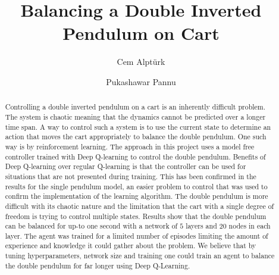 \documentclass{LTHtwocol} %
\begin{document}
\begin{frontmatter}
\title{Balancing a Double Inverted Pendulum on Cart} %

\author[cem]{Cem Alpt\"urk}
\author[pukashawar]{Pukashawar Pannu}


\begin{abstract}
    Controlling a double inverted pendulum on a cart is an inherently difficult problem.
    The system is chaotic meaning that the dynamics cannot be predicted over a longer time span.
    A way to control such a system is to use the current state to determine an action that moves the cart appropriately to balance the double pendulum.
    One such way is by reinforcement learning.
    The approach in this project uses a model free controller trained with Deep Q-learning to control the double pendulum.
    Benefits of Deep Q-learning over regular Q-learning is that the controller can be used for situations that are not presented during training.
    This has been confirmed in the results for the single pendulum model, an easier problem to control that was used to confirm the implementation of the learning algorithm.
    The double pendulum is more difficult with its chaotic nature and the limitation that the cart with a single degree of freedom is trying to control multiple states.
    Results show that the double pendulum can be balanced for up-to one second with a network of $5$ layers and $20$ nodes in each layer.
    The agent was trained for a limited number of episodes limiting the amount of experience and knowledge it could gather about the problem.
    We believe that by tuning hyperparameters, network size and training one could train an agent to balance the double pendulum for far longer using Deep Q-Learning.
\end{abstract}

\end{frontmatter}

\end{document}
